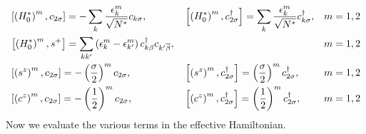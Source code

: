 \documentclass[12pt,twoside]{report}
\numberwithin{equation}{section}
\begin{document}
\begin{equation}\begin{aligned}
	&\left[\left(H_0^*\right)^m, c_{2\sigma}\right] = - \sum_k \frac{\epsilon^m_k}{\sqrt{N^*}}c_{k\sigma}, && \left[\left(H_0^*\right)^m, c^\dagger_{2\sigma}\right] = \sum_k \frac{\epsilon_k^m}{\sqrt{N^*}}c^\dagger_{k\sigma}, && m = 1, 2\\
	&\left[\left(H_0^*\right)^m, s^+\right] = \sum_{kk^\prime}\left(\epsilon_k^m - \epsilon_{k^\prime}^m\right)c^\dagger_{k\beta}c_{k^\prime \overline \beta} , &&&& m = 1, 2\\
	&\left[\left(s^z\right)^m, c_{2\sigma}\right] = - \left(\frac{\sigma}{2}\right)^mc_{2\sigma}, && \left[\left(s^z\right)^m, c^\dagger_{2\sigma}\right] = \left(\frac{\sigma}{2}\right)^mc^\dagger_{2\sigma}, && m = 1, 2\\
	&\left[\left(c^z\right)^m, c_{2\sigma}\right] = - \left(\frac{1}{2}\right)^mc_{2\sigma}, && \left[\left(c^z\right)^m, c^\dagger_{2\sigma}\right] = \left(\frac{1}{2}\right)^mc^\dagger_{2\sigma}, && m = 1, 2\\
\end{aligned}\end{equation}
Now we evaluate the various terms in the effective Hamiltonian.
\end{document}
